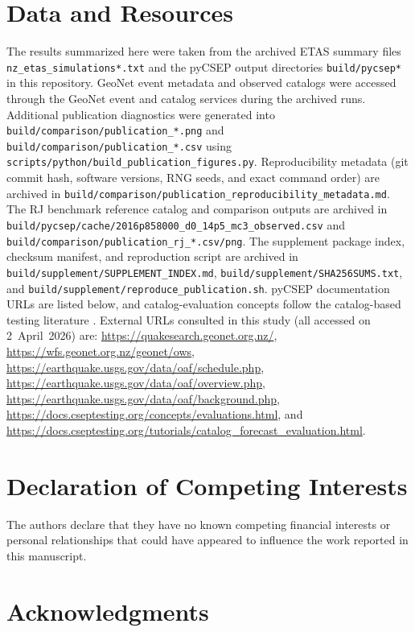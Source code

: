\documentclass[12pt,letterpaper]{article}
\begin{document}
\section*{Data and Resources}

The results summarized here were taken from the archived ETAS summary files
\texttt{nz\_etas\_simulations*.txt} and the pyCSEP output directories
\texttt{build/pycsep*} in this repository. GeoNet event metadata and observed
catalogs were accessed through the GeoNet event and catalog services during the
archived runs. Additional publication diagnostics were generated into
\texttt{build/comparison/publication\_*.png} and
\texttt{build/comparison/publication\_*.csv} using
\texttt{scripts/python/build\_publication\_figures.py}. Reproducibility metadata
(git commit hash, software versions, RNG seeds, and exact command order) are
archived in
\texttt{build/comparison/publication\_reproducibility\_metadata.md}. The
RJ benchmark reference catalog and comparison outputs are archived in
\texttt{build/pycsep/cache/2016p858000\_d0\_14p5\_mc3\_observed.csv} and
\texttt{build/comparison/publication\_rj\_*.csv/png}. The supplement package
index, checksum manifest, and reproduction script are archived in
\texttt{build/supplement/SUPPLEMENT\_INDEX.md},
\texttt{build/supplement/SHA256SUMS.txt}, and
\texttt{build/supplement/reproduce\_publication.sh}. pyCSEP documentation
URLs are listed below, and catalog-evaluation concepts follow the
catalog-based testing literature \cite{savran2020}. External URLs consulted in this study (all accessed on
2~April~2026) are:
\url{https://quakesearch.geonet.org.nz/},
\url{https://wfs.geonet.org.nz/geonet/ows},
\url{https://earthquake.usgs.gov/data/oaf/schedule.php},
\url{https://earthquake.usgs.gov/data/oaf/overview.php},
\url{https://earthquake.usgs.gov/data/oaf/background.php},
\url{https://docs.cseptesting.org/concepts/evaluations.html}, and
\url{https://docs.cseptesting.org/tutorials/catalog_forecast_evaluation.html}.

\section*{Declaration of Competing Interests}

The authors declare that they have no known competing financial interests or
personal relationships that could have appeared to influence the work reported
in this manuscript.

\section*{Acknowledgments}
\end{document}
